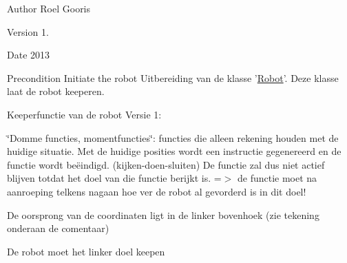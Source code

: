 \begin{DoxyAuthor}{Author}
Roel Gooris 
\end{DoxyAuthor}
\begin{DoxyVersion}{Version}
1. 
\end{DoxyVersion}
\begin{DoxyDate}{Date}
2013 
\end{DoxyDate}
\begin{DoxyPrecond}{Precondition}
Initiate the robot Uitbereiding van de klasse '\hyperlink{class_robot}{Robot}'. Deze klasse laat de robot keeperen.
\end{DoxyPrecond}
Keeperfunctie van de robot Versie 1\-:
\begin{DoxyItemize}
\item \char`\"{}\-Domme functies, momentfuncties\char`\"{}\-: functies die alleen rekening houden met de huidige situatie. Met de huidige posities wordt een instructie gegenereerd en de functie wordt beëindigd. (kijken-\/doen-\/sluiten) De functie zal dus niet actief blijven totdat het doel van die functie berijkt is. =$>$ de functie moet na aanroeping telkens nagaan hoe ver de robot al gevorderd is in dit doel!
\item De oorsprong van de coordinaten ligt in de linker bovenhoek (zie tekening onderaan de comentaar)
\item De robot moet het linker doel keepen
\end{DoxyItemize}


